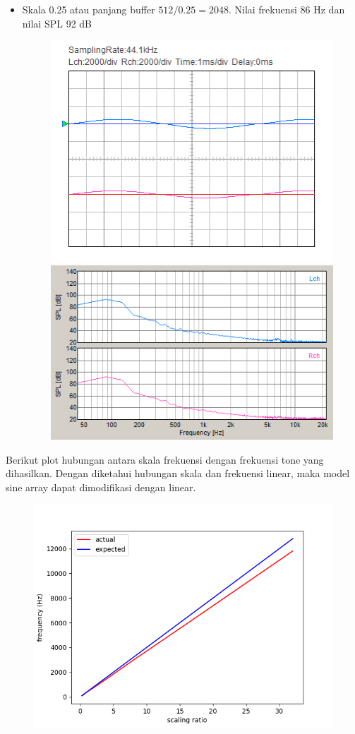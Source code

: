 \documentclass[12pt,]{article}
\begin{document}
\begin{itemize}
  		\newpage
  		\item Skala 0.25 atau panjang buffer $512/0.25 = 2048$.
  		Nilai frekuensi 86 Hz dan nilai SPL 92 dB
  		\begin{figure}[H]
  			\centering
  			\includegraphics[width=0.45\linewidth]{result/day_4/osi_sine0p25}
  			\includegraphics[width=0.45\linewidth]{result/day_4/fft_sine0p25}
  		\end{figure}
  	\end{itemize}

	Berikut plot hubungan antara skala frekuensi dengan frekuensi tone yang dihasilkan.
	Dengan diketahui hubungan skala dan frekuensi linear, maka model sine array dapat dimodifikasi dengan linear.
	\begin{figure}[H]
		\centering
		\includegraphics[width=0.45\linewidth]{result/analisa/freq_scaling}
	\end{figure}
\end{document}

